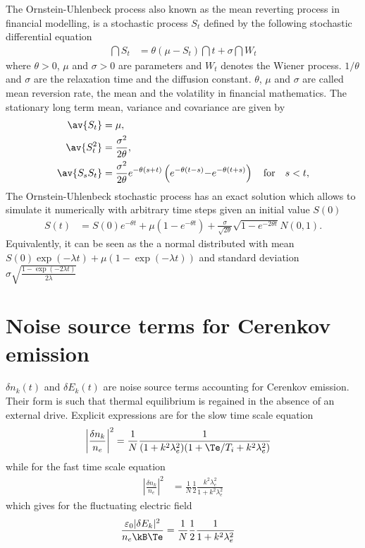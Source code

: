 \documentclass[10pt,a4paper]{article}
\def\dnk{\delta n_k}
\def\dEk{\delta E_k}
\begin{document}
The Ornstein-Uhlenbeck process also known as the mean reverting
process in financial modelling, is a stochastic process $S_t$ defined by the
following stochastic differential equation
\begin{align}
\dint{S_t}&=\theta(\mu-S_t)\dint{t} + \sigma \dint{W_t}
\end{align}
where $\theta>0$, $\mu$ and $\sigma>0$ are parameters and $W_t$ denotes the
Wiener process. $1/\theta$ and $\sigma$ are the relaxation time and the
diffusion constant. $\theta$, $\mu$ and $\sigma$ are called mean reversion rate,
the mean and the volatility in financial mathematics. 
The stationary long term mean, variance and covariance are given by
\begin{align}
\av{S_t} & = \mu, \\
\av{S_t^2} &= \frac{\sigma^2}{2\theta}, \\
\av{S_sS_t} &= \frac{\sigma^2}{2\theta}e^{-\theta(s{+}t)}
\left(e^{-\theta(t{-}s)}{-}e^{-\theta(t{+}s)}\right)\quad\text{for}\quad s<t,
\end{align}
The Ornstein-Uhlenbeck stochastic process has an exact solution which allows
to simulate it numerically with arbitrary time steps given an initial value
$S(0)$ \citep{gillespie:1996c,gillespie:1996b}
\begin{align}
S(t) &= S(0)e^{-\theta t} + 
\mu\left(1-e^{-\theta t}\right) + 
\frac{\sigma}{\sqrt{2\theta}}\sqrt{1-e^{-2\theta t}}N(0,1).
\end{align}
Equivalently, it can be seen as the a normal distributed with mean 
$S(0)\exp\left(-\lambda t\right)+\mu\left(1-\exp\left(-\lambda t\right)\right)$
and standard deviation 
$\sigma\sqrt{\frac{1-\exp\left(-2\lambda t\right)}{2\lambda}}$

\section{Noise source terms for Cerenkov emission}

$\dnk(t)$ and $\dEk(t)$ are noise source terms accounting
for Cerenkov emission. Their form is such that thermal equilibrium is
regained in the absence of an external drive. Explicit expressions
are for the slow time scale equation
\begin{align}
\left|\frac{\dnk}{n_e}\right|^2&=\frac{1}{N}\frac{1}
{(1+k^2\lambda_e^2)(1+\Te/T_i+k^2\lambda_e^2)}
\end{align}
while for the fast time scale equation
\begin{align}
\left|\frac{\dnk}{n_e}\right|^2&=\frac{1}{N}\frac{1}{2}\frac{k^2\lambda_e^2}
{1+k^2\lambda_e^2}
\end{align}
which gives for the fluctuating electric field
\begin{align}
\frac{\varepsilon_0|\dEk|^2}{n_e\kB
\Te}&=\frac{1}{N}\frac{1}{2}\frac{1}{1+k^2\lambda_e^2}
\end{align}
\end{document}
